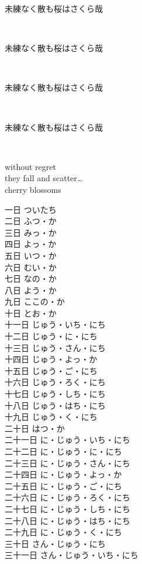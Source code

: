 \documentclass[8pt]{extreport}
\begin{document}
{\scriptsize \begin{CJK}{UTF8}{min}未練なく散も桜はさくら哉\end{CJK} \\}
{\footnotesize \begin{CJK}{UTF8}{min}未練なく散も桜はさくら哉\end{CJK} \\}
{\small \begin{CJK}{UTF8}{min}未練なく散も桜はさくら哉\end{CJK} \\}
{\normalsize \begin{CJK}{UTF8}{min}未練なく散も桜はさくら哉\end{CJK} \\}


without regret \\
they fall and scatter\ldots \\
cherry blossoms\\
\begin{CJK}{UTF8}{min}
一日	ついたち \\
二日	ふつ・か \\
三日	みっ・か \\
四日	よっ・か \\
五日	いつ・か \\
六日	むい・か \\
七日	なの・か \\
八日	よう・か \\
九日	ここの・か \\
十日	とお・か \\
十一日	じゅう・いち・にち \\
十二日	じゅう・に・にち \\
十三日	じゅう・さん・にち \\
十四日	じゅう・よっ・か \\
十五日	じゅう・ご・にち \\
十六日	じゅう・ろく・にち \\
十七日	じゅう・しち・にち \\
十八日	じゅう・はち・にち \\
十九日	じゅう・く・にち \\
二十日	はつ・か \\
二十一日	に・じゅう・いち・にち \\
二十二日	に・じゅう・に・にち \\
二十三日	に・じゅう・さん・にち \\
二十四日	に・じゅう・よっ・か \\
二十五日	に・じゅう・ご・にち \\
二十六日	に・じゅう・ろく・にち \\
二十七日	に・じゅう・しち・にち \\
二十八日	に・じゅう・はち・にち \\
二十九日	に・じゅう・く・にち \\
三十日	さん・じゅう・にち \\
三十一日	さん・じゅう・いち・にち\end{CJK} \\
\end{document}
